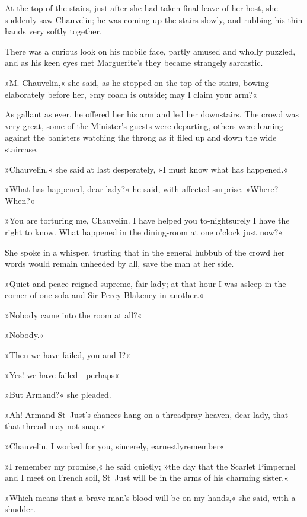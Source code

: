 At the top of the stairs, just after she had taken final leave of her host, she suddenly saw Chauvelin; he was coming up the stairs slowly, and rubbing his thin hands very softly together.

There was a curious look on his mobile face, partly amused and wholly puzzled, and as his keen eyes met Marguerite's they became strangely sarcastic.

»M. Chauvelin,« she said, as he stopped on the top of the stairs, bowing elaborately before her, »my coach is outside; may I claim your arm?«

As gallant as ever, he offered her his arm and led her downstairs. The crowd was very great, some of the Minister's guests were departing, others were leaning against the banisters watching the throng as it filed up and down the wide staircase.

»Chauvelin,« she said at last desperately, »I must know what has happened.«

»What has happened, dear lady?« he said, with affected surprise. »Where? When?«

»You are torturing me, Chauvelin. I have helped you to-night\textellipsis \allowbreak  \allowbreak surely I have the right to know. What happened in the dining-room at one o'clock just now?«

She spoke in a whisper, trusting that in the general hubbub of the crowd her words would remain unheeded by all, save the man at her side.

»Quiet and peace reigned supreme, fair lady; at that hour I was asleep in the corner of one sofa and Sir Percy Blakeney in another.«

»Nobody came into the room at all?«

»Nobody.«

»Then we have failed, you and I?\textellipsis«

»Yes! we have failed—perhaps\textellipsis«

»But Armand?« she pleaded.

»Ah! Armand St~Just's chances hang on a thread\textellipsis \allowbreak  pray heaven, dear lady, that that thread may not snap.«

»Chauvelin, I worked for you, sincerely, earnestly\textellipsis \allowbreak  remember\textellipsis«

»I remember my promise,« he said quietly; »the day that the Scarlet Pimpernel and I meet on French soil, St~Just will be in the arms of his charming sister.«

»Which means that a brave man's blood will be on my hands,« she said, with a shudder.

